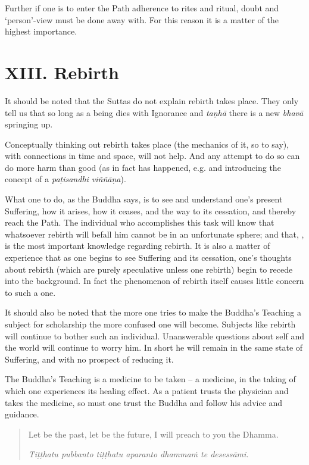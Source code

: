 Further if one is to enter the Path adherence to rites and ritual, doubt and `person'-view must be done away with. For this reason it is a matter of the highest importance.

\section{XIII. Rebirth}

It should be noted that the Suttas do not explain  rebirth takes place. They only tell us that so long as a being dies with Ignorance and \emph{taṇhā} there is a new \emph{bhavā} springing up.

Conceptually thinking out  rebirth takes place (the mechanics of it, so to say), with connections in time and space, will not help. And any attempt to do so can do more harm than good (as in fact has happened, e.g.  and introducing the concept of a \emph{paṭisandhi viññāṇa}).

What one  to do, as the Buddha says, is to see and understand one's present Suffering, how it arises, how it ceases, and the way to its cessation, and thereby reach the Path. The individual who accomplishes this task will know that whatsoever rebirth will befall him cannot be in an unfortunate sphere; and that, , is the most important knowledge regarding rebirth. It is also a matter of experience that as one begins to see Suffering and its cessation, one's thoughts about rebirth (which are purely speculative unless one  rebirth) begin to recede into the background. In fact the phenomenon of rebirth itself causes little concern to such a one.

It should also be noted that the more one tries to make the Buddha's Teaching a subject for scholarship the more confused one will become. Subjects like rebirth will continue to bother such an individual. Unanswerable questions about self and the world will continue to worry him. In short he will remain in the same state of Suffering, and with no prospect of reducing it.

The Buddha's Teaching is a medicine to be taken -- a medicine, in the taking of which one experiences its healing effect. As a patient trusts the physician and takes the medicine, so must one trust the Buddha and follow his advice and guidance.

\begin{quote}
Let be the past, let be the future, I will preach to you the Dhamma.

\emph{Tiṭṭhatu pubbanto tiṭṭhatu aparanto dhammaṁ te desessāmi.}
\end{quote}

